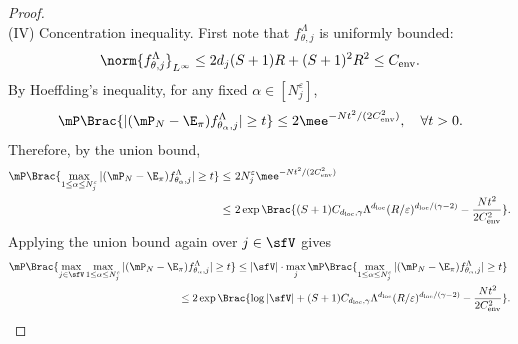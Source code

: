\documentclass[11pt]{article}
\begin{document}
\begin{proof}
\ \\[-5pt]
\noindent
(IV) Concentration inequality.
%
First note that $f_{\theta,j}^\Lambda$ is uniformly bounded:
\[
    \norm{f_{\theta,j}^\Lambda}_{L^\infty} \le 2d_j(S+1)R+(S+1)^2R^2 \le C_{\rm env}.
\]
By Hoeffding's inequality, for any fixed $\alpha \in [N_j^\varepsilon]$,
\[
    \mP \Brac{ | (\mP_N - \E_\pi) f_{\theta_\alpha,j}^\Lambda | \ge t } \le 2\mee^{-Nt^2/(2C_{\rm env}^2)}, \quad \forall t > 0.
\]
Therefore, by the union bound,
\begin{align*}
    \mP \Brac{ \max_{1\le \alpha\le N_j^\varepsilon} | (\mP_N - \E_\pi) f_{\theta_\alpha,j}^\Lambda | \ge t } \le~& 2N_j^\varepsilon \mee^{-Nt^2/(2C_{\rm env}^2)} \\
    \le~& 2\exp \Brac{  (S+1) C_{d_{\rm loc},\gamma}\Lambda^{d_{\rm loc}} (R/\varepsilon)^{d_{\rm loc}/(\gamma-2)} - \frac{N t^2}{2C_{\rm env}^2} }.
\end{align*}
Applying the union bound again over $j \in \sfV$ gives
\begin{equation}
\label{eqn:pf_LSM_max_ineq}
\begin{split}
    \mP \Brac{ \max_{j\in \sfV} \max_{1\le \alpha\le N_j^\varepsilon} | (\mP_N - \E_\pi) f_{\theta_\alpha,j}^\Lambda | \ge t } \le |\sfV| \cdot \max_j \mP \Brac{ \max_{1\le \alpha\le N_j^\varepsilon} | (\mP_N - \E_\pi) f_{\theta_\alpha,j}^\Lambda | \ge t } &\\
    \le 2\exp \Brac{ \log |\sfV| + (S+1) C_{d_{\rm loc},\gamma}\Lambda^{d_{\rm loc}} (R/\varepsilon)^{d_{\rm loc}/(\gamma-2)} - \frac{N t^2}{2C_{\rm env}^2} } &.
\end{split}
\end{equation}


\end{proof}
\end{document}
